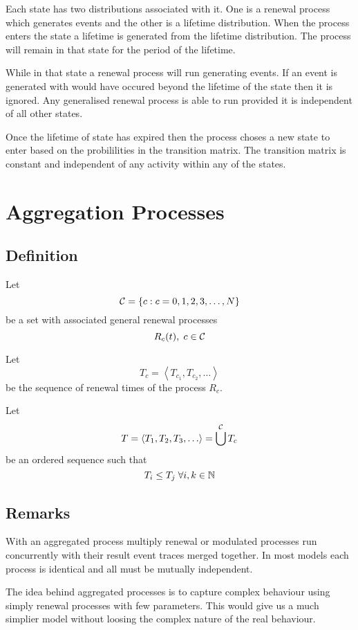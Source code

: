 Each state has two distributions associated with it.  One is a renewal
process which generates events and the other is a lifetime
distribution.  When the process enters the state a lifetime is
generated from the lifetime distribution.  The process will remain in
that state for the period of the lifetime.

While in that state a renewal process will run generating events.  If
an event is generated with would have occured beyond the lifetime of
the state then it is ignored.  Any generalised renewal process is able
to run provided it is independent of all other states.

Once the lifetime of state has expired then the process choses a new
state to enter based on the probililities in the transition matrix.
The transition matrix is constant and independent of any activity
within any of the states.

\section{Aggregation Processes}

\subsection{Definition}

Let
\[ {\cal C} = \{c:c = 0,1,2,3,\ldots, N\} \]
be a set with associated general renewal processes
\[R_c(t), \; c \in {\cal C} \]

Let
\[ T_c = \left< T_{c_1}, T_{c_2}, \ldots \right> \]
 be the sequence of renewal times of the process $R_c$.

Let 
\[ T = \left<T_1, T_2, T_3, \ldots \right> = \bigcup^{\cal C}T_c \]
 be an ordered sequence such that 
\[ T_i \leq T_j \; \forall i,k \in {\Bbb N} \]

\subsection{Remarks}

With an aggregated process multiply renewal or modulated processes run
concurrently with their result event traces merged together.  In most
models each process is identical and all must be mutually independent.

The idea behind aggregated processes is to capture complex behaviour
using simply renewal processes with few parameters.  This would give
us a much simplier model without loosing the complex nature of the
real behaviour.

